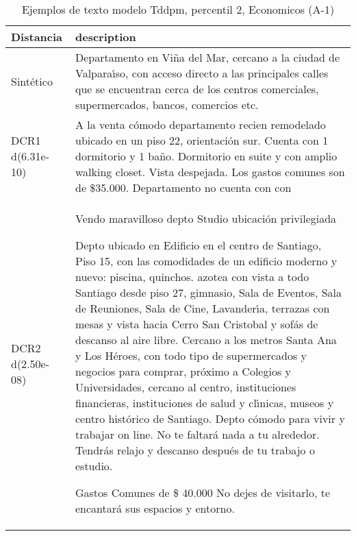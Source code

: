 \begin{table}[H]
\centering
\fontsize{10}{14}\selectfont
\caption{Ejemplos de texto modelo Tddpm, percentil 2, Economicos (A-1)}
\label{table-example-economicos-a-1-tddpm_mlp-2p-text}
\begin{tabular}{|l|m{35em}|}
\hline
\rowcolor[gray]{0.8}
Distancia & description \\
\hline Sintético & Departamento en Vi\~na del Mar, cercano a la ciudad de Valpara{\'\i}so, con acceso directo a las principales calles que se encuentran cerca de los centros comerciales, supermercados, bancos, comercios etc. \\
\hline DCR1 d(6.31e-10) & A la venta c\'omodo departamento recien remodelado ubicado en un piso 22, orientaci\'on sur. Cuenta con 1 dormitorio y 1 ba\~no. Dormitorio en suite y con amplio walking closet. Vista despejada. Los gastos comunes son de \$35.000. Departamento no cuenta con con \\
\hline DCR2 d(2.50e-08) & Vendo maravilloso depto Studio ubicaci\'on privilegiada

Depto ubicado en Edificio en el centro de Santiago, Piso 15, con las  comodidades de un edificio moderno y nuevo:  piscina,  quinchos.  azotea  con  vista  a todo Santiago  desde piso 27, gimnasio,  Sala de Eventos,  Sala de Reuniones,  Sala  de Cine, Lavander{\'\i}a,  terrazas con mesas  y vista  hacia  Cerro San Cristobal y  sof\'as de descanso al aire libre.
Cercano a los metros  Santa Ana y  Los H\'eroes,  con  todo tipo  de supermercados y negocios  para comprar,  pr\'oximo a  Colegios y Universidades,  cercano  al centro,  instituciones financieras,  instituciones de salud y cl{\'\i}nicas,  museos  y  centro hist\'orico de Santiago.
Depto c\'omodo  para  vivir y trabajar on line.
No te faltar\'a nada a tu alrededor.
Tendr\'as  relajo y descanso  despu\'es  de tu trabajo o estudio. 

Gastos Comunes  de  \$ 40.000 
No dejes de visitarlo,  te encantar\'a sus espacios y entorno. \\
\hline
\end{tabular}
\end{table}

